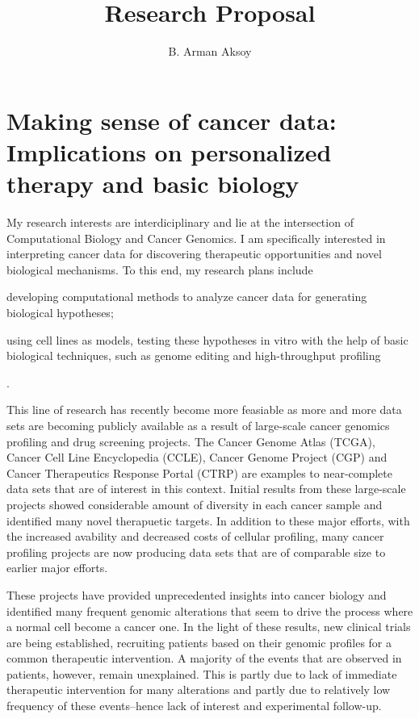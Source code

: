 \documentclass[12pt,letterpaper]{article}
\title{Research Proposal}
\author{B. Arman Aksoy}
\date{}
\begin{document}
\maketitle

\section*{Making sense of cancer data: Implications on personalized therapy and basic biology}
My research interests are interdiciplinary and lie at the intersection of Computational Biology and Cancer Genomics.
I am specifically interested in interpreting cancer data for discovering therapeutic opportunities and novel biological mechanisms.
To this end, my research plans include
\begin{inparaenum}[(i)]
 \item developing computational methods to analyze cancer data for generating biological hypotheses;
 \item using cell lines as models, testing these hypotheses in vitro with the help of basic biological techniques, such as genome editing and high-throughput profiling
\end{inparaenum}.

This line of research has recently become more feasiable as more and more data sets are becoming publicly available as a result of large-scale cancer genomics profiling and drug screening projects. 
The Cancer Genome Atlas (TCGA), Cancer Cell Line Encyclopedia (CCLE), Cancer Genome Project (CGP) and Cancer Therapeutics Response Portal (CTRP) are examples to near-complete data sets that are of interest in this context.
Initial results from these large-scale projects showed considerable amount of diversity in each cancer sample
and identified many novel therapuetic targets.
In addition to these major efforts, with the increased avability and decreased costs of cellular profiling, many cancer profiling projects are now producing data sets that are of comparable size to earlier major efforts.

These projects have provided unprecedented insights into cancer biology
and identified many frequent genomic alterations that seem to drive the process where a normal cell become a cancer one.
In the light of these results, new clinical trials are being established, recruiting patients based on their genomic profiles for a common therapeutic intervention.
A majority of the events that are observed in patients, however, remain unexplained.
This is partly due to lack of immediate therapeutic intervention for many alterations
and partly due to relatively low frequency of these events--hence lack of interest and experimental follow-up.
\end{document}
